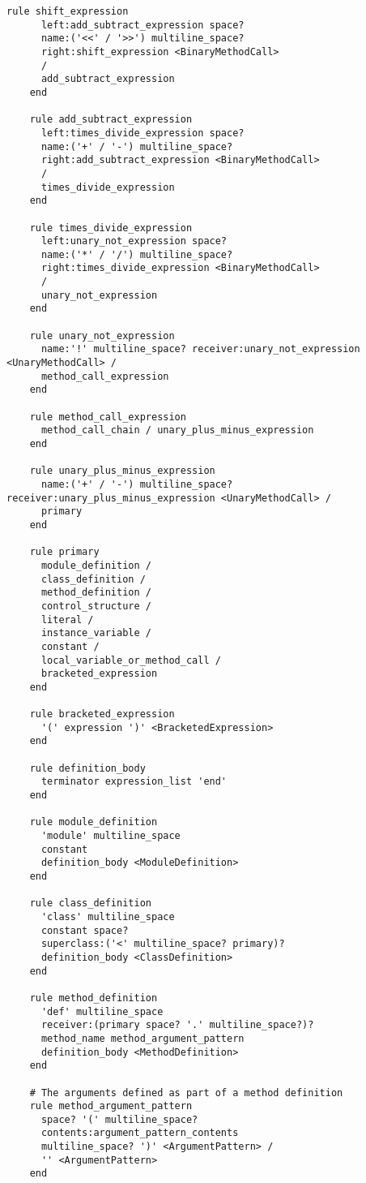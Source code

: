 \begin{lstlisting}[title={\small\Helvetica parser/language.treetop},language=treetop]
    rule shift_expression
      left:add_subtract_expression space?
      name:('<<' / '>>') multiline_space?
      right:shift_expression <BinaryMethodCall>
      /
      add_subtract_expression
    end
    
    rule add_subtract_expression
      left:times_divide_expression space?
      name:('+' / '-') multiline_space?
      right:add_subtract_expression <BinaryMethodCall>
      /
      times_divide_expression
    end
    
    rule times_divide_expression
      left:unary_not_expression space?
      name:('*' / '/') multiline_space?
      right:times_divide_expression <BinaryMethodCall>
      /
      unary_not_expression
    end
    
    rule unary_not_expression
      name:'!' multiline_space? receiver:unary_not_expression <UnaryMethodCall> /
      method_call_expression
    end
    
    rule method_call_expression
      method_call_chain / unary_plus_minus_expression
    end
    
    rule unary_plus_minus_expression
      name:('+' / '-') multiline_space? receiver:unary_plus_minus_expression <UnaryMethodCall> /
      primary
    end
    
    rule primary
      module_definition /
      class_definition /
      method_definition /
      control_structure /
      literal /
      instance_variable /
      constant /
      local_variable_or_method_call /
      bracketed_expression
    end
    
    rule bracketed_expression
      '(' expression ')' <BracketedExpression>
    end
    
    rule definition_body
      terminator expression_list 'end'
    end
    
    rule module_definition
      'module' multiline_space
      constant
      definition_body <ModuleDefinition>
    end
    
    rule class_definition
      'class' multiline_space
      constant space?
      superclass:('<' multiline_space? primary)?
      definition_body <ClassDefinition>
    end
    
    rule method_definition
      'def' multiline_space
      receiver:(primary space? '.' multiline_space?)?
      method_name method_argument_pattern
      definition_body <MethodDefinition>
    end
    
    # The arguments defined as part of a method definition
    rule method_argument_pattern
      space? '(' multiline_space?
      contents:argument_pattern_contents
      multiline_space? ')' <ArgumentPattern> /
      '' <ArgumentPattern>
    end
    

\end{lstlisting}
